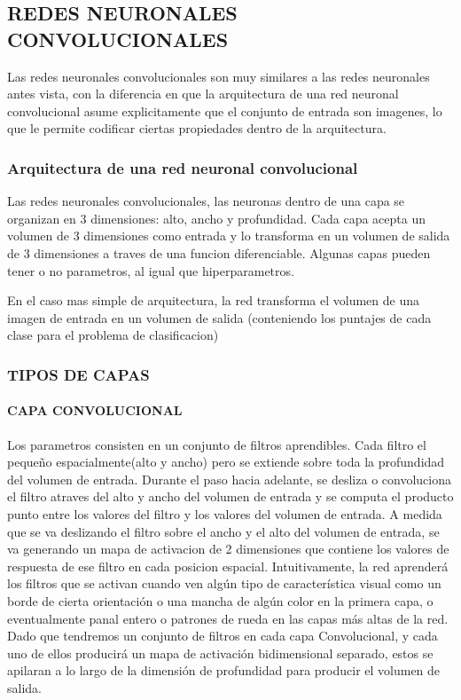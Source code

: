 \documentclass[a4paper,10pt]{article}
\begin{document}
\subsection {REDES NEURONALES CONVOLUCIONALES}
Las redes neuronales convolucionales son muy similares a las redes neuronales antes vista, con la diferencia en que la arquitectura de una red neuronal convolucional asume explicitamente
que el conjunto de entrada son imagenes, lo que le permite codificar ciertas propiedades dentro de la arquitectura.

\subsubsection {Arquitectura de una red neuronal convolucional}
Las redes neuronales convolucionales, las neuronas dentro de una capa se organizan en 3 dimensiones: alto, ancho y profundidad.
Cada capa acepta un volumen de 3 dimensiones como entrada y lo transforma en un volumen de salida de 3 dimensiones a traves de una funcion diferenciable.
Algunas capas pueden tener o no parametros, al igual que hiperparametros.

En el caso mas simple de arquitectura, la red transforma el volumen de una imagen de entrada en un volumen de salida (conteniendo los puntajes de cada clase para el problema de clasificacion)

\subsubsection {TIPOS DE CAPAS}
\paragraph{CAPA CONVOLUCIONAL} 
Los parametros consisten en un conjunto de filtros aprendibles. Cada filtro el pequeño espacialmente(alto y ancho) pero se extiende sobre toda la profundidad del volumen de entrada.
Durante el paso hacia adelante, se desliza o convoluciona el filtro atraves del alto y ancho del volumen de entrada y se computa el producto punto entre los valores del filtro y los valores
del volumen de entrada. A medida que se va deslizando el filtro sobre el ancho y el alto del volumen de entrada, se va generando un mapa de activacion de 2 dimensiones que contiene los 
valores de respuesta de ese filtro en cada posicion espacial.
Intuitivamente, la red aprenderá los filtros que se activan cuando ven algún tipo de característica visual como un borde de cierta orientación o una mancha de algún color en la 
primera capa, o eventualmente panal entero o patrones de rueda en las capas más altas de la red. Dado que tendremos un conjunto de filtros en cada capa Convolucional, 
y cada uno de ellos producirá un mapa de activación bidimensional separado, estos se apilaran a lo largo de la dimensión de profundidad para producir el volumen de salida.
\end{document}
